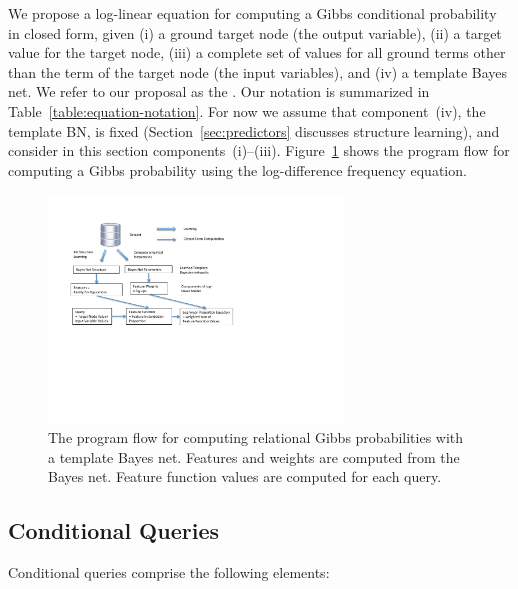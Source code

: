 \documentclass[twoside,11pt]{article}
\begin{document}
We propose a log-linear equation for computing a Gibbs conditional probability in closed form, given (i) a ground target node (the output variable), (ii) a target value for the target node, (iii) a complete set of values for all ground terms other than the term of the target node (the input variables), and (iv) a template Bayes net. We refer to our proposal as the 
. Our notation is summarized in Table~\ref{table:equation-notation}. For now we assume that component~(iv), the template BN, is fixed (Section~\ref{sec:predictors} discusses structure learning), and consider in this section components~(i)--(iii). 
Figure~\ref{fig:bn-flow} shows the program flow for computing a Gibbs probability using the log-difference frequency equation.

% 

\begin{figure}[htbp]

\begin{center}
\vspace{-2.6cm}
\includegraphics[width=0.7\textwidth]{figures/bn-regress}
\caption{The program flow for computing relational Gibbs probabilities with a template Bayes net. Features and weights are computed from the Bayes net. Feature function values are computed for each query.}
\label{fig:bn-flow}
\end{center}
\end{figure}


 \subsection{Conditional Queries} Conditional queries comprise the following elements:
 
\end{document}
